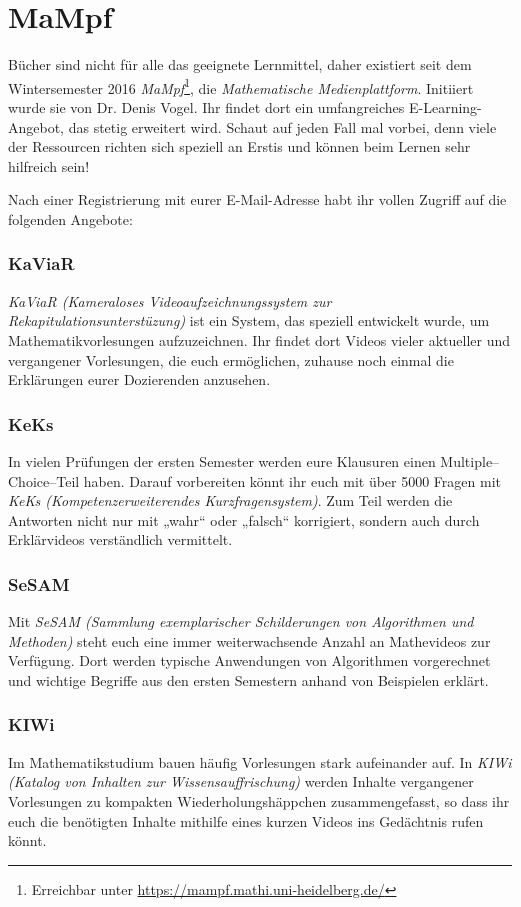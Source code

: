 \section{MaMpf}
\label{mampf}

Bücher sind nicht für alle das geeignete Lernmittel, daher existiert seit dem Wintersemester 2016 \emph{MaMpf}\footnote{Erreichbar unter \url{https://mampf.mathi.uni-heidelberg.de/}}, die \emph{Mathematische Medienplattform}. Initiiert wurde sie von Dr. Denis Vogel. Ihr findet dort ein umfangreiches E-Learning-Angebot, das stetig erweitert wird. Schaut auf jeden Fall mal vorbei, denn viele der Ressourcen richten sich speziell an Erstis und können beim Lernen sehr hilfreich sein!

Nach einer Registrierung mit eurer E-Mail-Adresse habt ihr vollen Zugriff auf die folgenden Angebote:

\subsubsection{KaViaR}
\emph{KaViaR (Kameraloses Videoaufzeichnungssystem zur Rekapitulationsunterstüzung)} ist ein System, das speziell entwickelt wurde, um Mathematikvorlesungen aufzuzeichnen. Ihr findet dort Videos vieler aktueller und vergangener Vorlesungen, die euch ermöglichen, zuhause noch einmal die Erklärungen eurer Dozierenden anzusehen.

\subsubsection{KeKs}
In vielen Prüfungen der ersten Semester werden eure Klausuren einen Multiple--Choice--Teil haben. Darauf vorbereiten könnt ihr euch mit über 5000 Fragen mit \emph{KeKs (Kompetenzerweiterendes Kurzfragensystem)}. Zum Teil werden die Antworten nicht nur mit „wahr“ oder „falsch“ korrigiert, sondern auch durch Erklärvideos verständlich vermittelt.

\subsubsection{SeSAM}
Mit \emph{SeSAM (Sammlung exemplarischer Schilderungen von Algorithmen und Methoden)} steht euch eine immer weiterwachsende Anzahl an Mathevideos zur Verfügung. Dort werden typische Anwendungen von Algorithmen vorgerechnet und wichtige Begriffe aus den ersten Semestern anhand von Beispielen erklärt. 

\subsubsection{KIWi}
Im Mathematikstudium bauen häufig Vorlesungen stark aufeinander auf. In \emph{KIWi (Katalog von Inhalten zur Wissensauffrischung)} werden Inhalte vergangener Vorlesungen zu kompakten Wiederholungshäppchen zusammengefasst, so dass ihr euch die benötigten Inhalte mithilfe eines kurzen Videos ins Gedächtnis rufen könnt.

